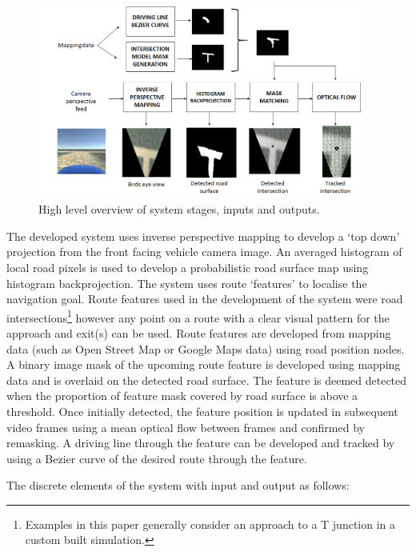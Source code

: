 \documentclass[]{aiaa-tc}%
\begin{document}
\begin{figure}
	\centering
	\includegraphics[width=0.95\textwidth]{systemOverview.png}
	\caption{High level overview of system stages, inputs and outputs.}
	\label{f:systemOverview}
\end{figure}


The developed system uses inverse perspective mapping to develop a `top down' projection from the front facing vehicle camera image. An averaged histogram of local road pixels is used to develop a probabilistic road surface map using histogram backprojection. The system uses route `features' to localise the navigation goal. Route features used in the development of the system were road intersections\footnote{Examples in this paper generally consider an approach to a T junction in a custom built simulation.} however any point on a route with a clear visual pattern for the approach and exit(s) can be used. Route features are developed from mapping data (such as Open Street Map or Google Maps data) using road position nodes. A binary image mask of the upcoming route feature is developed using mapping data and is overlaid on the detected road surface. The feature is deemed detected when the proportion of feature mask covered by road surface is above a threshold. Once initially detected, the feature position is updated in subsequent video frames using a mean optical flow between frames and confirmed by remasking. A driving line through the feature can be developed and tracked by using a Bezier curve of the desired route through the feature.

The discrete elements of the system with input and output as follows: 
\end{document}
